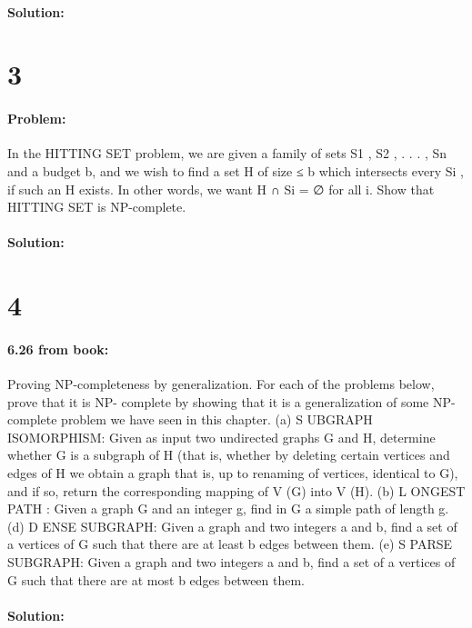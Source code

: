 \documentclass[12pt]{article}
\begin{document}
\paragraph{Solution:}

\section*{3}
\paragraph{Problem:}
In the HITTING SET problem, we are given a family of sets {S1 , S2 , . . . , Sn } and a budget b, and
we wish to find a set H of size ≤ b which intersects every Si , if such an H exists. In other words,
we want H ∩ Si = ∅ for all i.
Show that
HITTING SET
is NP-complete.

\paragraph{Solution:}

\section*{4}
\paragraph{6.26 from book:}
Proving NP-completeness by generalization. For each of the problems below, prove that it is NP-
complete by showing that it is a generalization of some NP-complete problem we have seen in
this chapter.
(a) S UBGRAPH ISOMORPHISM: Given as input two undirected graphs G and H, determine
whether G is a subgraph of H (that is, whether by deleting certain vertices and edges of H
we obtain a graph that is, up to renaming of vertices, identical to G), and if so, return the
corresponding mapping of V (G) into V (H).
(b) L ONGEST
PATH :
Given a graph G and an integer g, find in G a simple path of length g.
(d) D ENSE SUBGRAPH: Given a graph and two integers a and b, find a set of a vertices of G
such that there are at least b edges between them.
(e) S PARSE SUBGRAPH: Given a graph and two integers a and b, find a set of a vertices of G
such that there are at most b edges between them.

\paragraph{Solution:}
\end{document}
